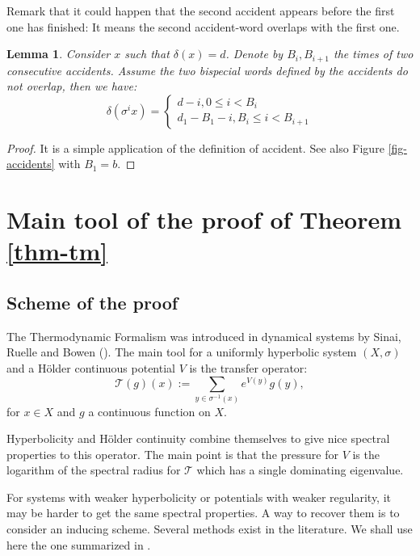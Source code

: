 \documentclass[11 pt]{article}
\newtheorem{lemma}[proposition]{Lemma}
\newcommand {\CT}{{\mathcal T}}
\def\s{\sigma}
\theoremstyle{definition}
\begin{document}
Remark that it could happen that the second accident appears before the first one has finished: It means the second accident-word overlaps with the first one.




\begin{lemma}\label{lem:deux-acc}
Consider $x$ such that $\delta(x)=d$. Denote by $B_i, B_{i+1}$ the times of two consecutive accidents. Assume the two bispecial words defined by the accidents do not overlap, then we have:
$$\delta(\sigma^ix)=\begin{cases}
d-i, 0\leq i< B_i\\
d_1-B_1-i, B_i\le i< B_{i+1}
\end{cases}$$
\end{lemma}
\begin{proof}
It is a simple application of the definition of accident. See also Figure \ref{fig-accidents} with $B_{1}=b$.
\end{proof}







\section{Main tool of the proof of Theorem \ref{thm-tm} }
\subsection{Scheme of the proof}
The Thermodynamic Formalism was introduced in dynamical systems by Sinai, Ruelle and Bowen (\cite{sinai,Ruelle.78,Bow.08}). The main tool for  a uniformly hyperbolic system $(X,\sigma)$ and a H\"older continuous potential $V$ is the transfer operator:
$$\CT(g)(x):=\sum_{y\in\s^{-1}(x)}e^{V(y)}g(y),$$
for $x\in X$ and $g$ a continuous function on $X$.


Hyperbolicity and H\"older continuity combine themselves to give nice spectral properties to this operator. The main point is that  the pressure for $V$ is the logarithm of the spectral radius for $\CT$ which has a single dominating eigenvalue. 

For systems with weaker hyperbolicity or potentials with weaker regularity, it may be harder to get the same spectral properties. A way to recover them is to consider an inducing scheme. Several methods exist in the literature. We shall use here the one summarized in \cite{lepl-survey}. 
\end{document}
